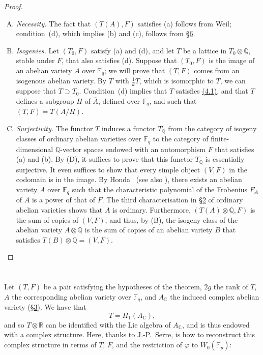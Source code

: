 \documentclass{article}
\newcommand{\FF}{\mathbb{F}}
\newcommand{\QQ}{\mathbb{Q}}
\newcommand{\RR}{\mathbb{R}}
\newcommand{\CC}{\mathbb{C}}
\newcommand{\oldpage}[1]{\marginpar{\footnotesize$\Big\vert$ \textit{p.~#1}}}
\begin{document}
\begin{proof}
\begin{enumerate}[(A)]
    \item \emph{Necessity.}
      The fact that $(T(A),F)$ satisfies (a) follows from Weil;
        condition~(d), which implies (b) and (c), follows from \hyperref[6]{\S6}.
\oldpage{242}
    \item \emph{Isogenies.}
      Let $(T_0,F)$ satisfy (a) and (d), and let $T$ be a lattice in $T_0\otimes\QQ$, stable under $F$, that also satisfies (d).
      Suppose that $(T_0,F)$ is the image of an abelian variety $A$ over $\FF_q$; we will prove that $(T,F)$ comes from an isogenous abelian variety.
      By $T$ with $\frac1k T$, which is isomorphic to $T$, we can suppose that $T\supset T_0$.
      Condition~(d) implies that $T$ satisfies \hyperref[4.1]{(4.1)}, and that $T$ defines a subgroup $H$ of $\overline{A}$, defined over $\FF_q$, and such that $(T,F)=T(A/H)$.
    \item \emph{Surjectivity.}
      The functor $T$ induces a functor $T_\QQ$ from the category of isogeny classes of ordinary abelian varieties over $\FF_q$ to the category of finite-dimensional $\QQ$-vector spaces endowed with an automorphism $F$ that satisfies (a) and (b).
      By (D), it suffices to prove that this functor $T_\QQ$ is essentially surjective.
      It even suffices to show that every simple object $(V,F)$ in the codomain is in the image.
      By Honda~\cite{1} (see also \cite{6}), there exists an abelian variety $A$ over $\FF_q$ such that the characteristic polynomial of the Frobenius $F_A$ of $A$ is a power of that of $F$.
      The third characterisation in \hyperref[2]{\S2} of ordinary abelian varieties shows that $A$ is ordinary.
      Furthermore, $(T(A)\otimes\QQ,F)$ is the sum of copies of $(V,F)$, and thus, by (B), the isogeny class of the abelian variety $A\otimes\QQ$ is the sum of copies of an abelian variety $B$ that satisfies $T(B)\otimes\QQ=(V,F)$.
  \end{enumerate}
\end{proof}


\section{}
\label{8}
Let $(T,F)$ be a pair satisfying the hypotheses of the theorem, $2g$ the rank of $T$, $A$ the corresponding abelian variety over $\FF_q$, and $A_\CC$ the induced complex abelian variety (\hyperref[3]{\S3}).
We have that
\[
  T= H_1(A_\CC),
\]
and so $T\otimes\RR$ can be identified with the Lie algebra of $A_\CC$, and is thus endowed with a complex structure.
Here, thanks to J.-P.~Serre, is how to reconstruct this complex structure in terms of $T$, $F$, and the restriction of $\varphi$ to $W_0(\FF_p)$:
\end{document}
